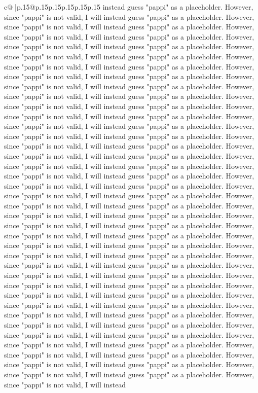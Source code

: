 \documentclass{article}
\begin{document}
{\begin{supertabular}{c@{$\;$}|p{.15\linewidth}@{}p{.15\linewidth}p{.15\linewidth}p{.15\linewidth}p{.15\linewidth}p{.15\linewidth}}
{{{instead guess "pappi" as a placeholder. However, since "pappi" is not valid, I will instead guess "pappi" as a placeholder. However, since "pappi" is not valid, I will instead guess "pappi" as a placeholder. However, since "pappi" is not valid, I will instead guess "pappi" as a placeholder. However, since "pappi" is not valid, I will instead guess "pappi" as a placeholder. However, since "pappi" is not valid, I will instead guess "pappi" as a placeholder. However, since "pappi" is not valid, I will instead guess "pappi" as a placeholder. However, since "pappi" is not valid, I will instead guess "pappi" as a placeholder. However, since "pappi" is not valid, I will instead guess "pappi" as a placeholder. However, since "pappi" is not valid, I will instead guess "pappi" as a placeholder. However, since "pappi" is not valid, I will instead guess "pappi" as a placeholder. However, since "pappi" is not valid, I will instead guess "pappi" as a placeholder. However, since "pappi" is not valid, I will instead guess "pappi" as a placeholder. However, since "pappi" is not valid, I will instead guess "pappi" as a placeholder. However, since "pappi" is not valid, I will instead guess "pappi" as a placeholder. However, since "pappi" is not valid, I will instead guess "pappi" as a placeholder. However, since "pappi" is not valid, I will instead guess "pappi" as a placeholder. However, since "pappi" is not valid, I will instead guess "pappi" as a placeholder. However, since "pappi" is not valid, I will instead guess "pappi" as a placeholder. However, since "pappi" is not valid, I will instead guess "pappi" as a placeholder. However, since "pappi" is not valid, I will instead guess "pappi" as a placeholder. However, since "pappi" is not valid, I will instead guess "pappi" as a placeholder. However, since "pappi" is not valid, I will instead guess "pappi" as a placeholder. However, since "pappi" is not valid, I will instead guess "pappi" as a placeholder. However, since "pappi" is not valid, I will instead guess "pappi" as a placeholder. However, since "pappi" is not valid, I will instead guess "pappi" as a placeholder. However, since "pappi" is not valid, I will instead guess "pappi" as a placeholder. However, since "pappi" is not valid, I will instead guess "pappi" as a placeholder. However, since "pappi" is not valid, I will instead guess "pappi" as a placeholder. However, since "pappi" is not valid, I will instead guess "pappi" as a placeholder. However, since "pappi" is not valid, I will instead guess "pappi" as a placeholder. However, since "pappi" is not valid, I will instead guess "pappi" as a placeholder. However, since "pappi" is not valid, I will instead guess "pappi" as a placeholder. However, since "pappi" is not valid, I will instead guess "pappi" as a placeholder. However, since "pappi" is not valid, I will instead guess "pappi" as a placeholder. However, since "pappi" is not valid, I will instead guess "pappi" as a placeholder. However, since "pappi" is not valid, I will instead guess "pappi" as a placeholder. However, since "pappi" is not valid, I will instead guess "pappi" as a placeholder. However, since "pappi" is not valid, I will instead }}}
\end{supertabular}}
\end{document}
